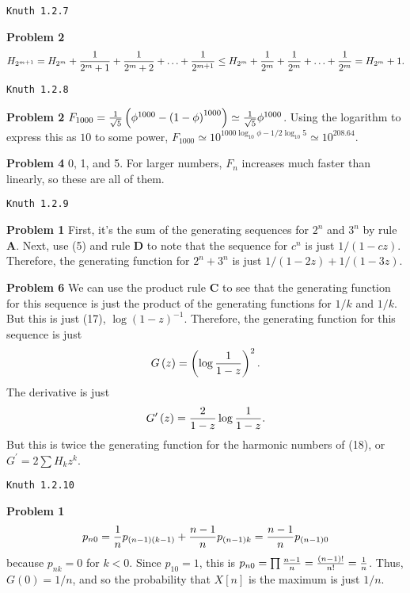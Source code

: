 \vskip 0.5in
\centerline{\tt Knuth 1.2.7}
\vskip 0.5in

\noindent
{\bf Problem 2} $$ H_{2^{m+1}} = H_{2^m} + {1 \over 2^m+1 } + {1 \over 2^m + 2 } + \ldots + {1 \over 2^{m+1}}
 \le H_{2^m} + {1 \over 2^m} + {1 \over 2^m} + \ldots + {1\over 2^m} = H_{2^m} + 1. $$

\vskip 0.5in
\centerline{\tt Knuth 1.2.8}
\vskip 0.5in

\noindent
{\bf Problem 2} $F_{1000} = {1 \over \sqrt{5}} \left( \phi^{1000} - \left(1-\phi \right)^{1000} \right) 
 \simeq {1 \over \sqrt{5}} \phi^{1000}$.  Using the logarithm to express this as $10$ to some power, 
  $F_{1000} \simeq 10^{1000 \log_{10} \phi - 1/2 \log_{10} 5} \simeq 10^{208.64}$.

\vskip 0.1in
\noindent
{\bf Problem 4} 0, 1, and 5.  For larger numbers, $F_n$ increases much faster than linearly, so these are
 all of them.
 
\vskip 0.5in
\centerline{\tt Knuth 1.2.9}
\vskip 0.5in

\noindent
{\bf Problem 1} First, it's the sum of the generating sequences for $2^n$ and $3^n$ by rule {\bf A}.  Next,
  use (5) and rule {\bf D} to note that the sequence for $c^n$ is just $1 / \left( 1-c z \right)$.  Therefore, the generating
  function for $2^n + 3^n$ is just $1 / \left( 1 - 2 z \right) + 1 / \left(1 - 3 z\right)$.

\vskip 0.1in
\noindent
{\bf Problem 6} We can use the product rule {\bf C} to see that the generating function for this sequence
 is just the product of the generating functions for $1/k$ and $1/k$.  But this is just (17), $ \log \left(1-z\right)^{-1}$.
 Therefore, the generating function for this sequence is just 
 $$
    G\left(z\right) = \left( \log {1 \over 1 - z} \right)^2.
 $$
 The derivative is just 
 $$
   G^{\prime} \left(z\right) = {2 \over 1-z} \log {1 \over 1-z}.
 $$
 But this is twice the generating function for the harmonic numbers of (18), or
 $G^{\prime} = 2 \sum H_k z^k$.

\vskip 0.5in
\centerline{\tt Knuth 1.2.10}
\vskip 0.5in

\noindent
{\bf Problem 1} 
  $$ 
     p_{n0} = {1 \over n} p_{\left(n-1\right)\left(k-1\right)} + {n-1 \over n} p_{\left(n-1\right) k}
            = {n - 1 \over n} p_{\left(n-1\right) 0}
  $$
  because $p_{nk} = 0$ for $k < 0$.  Since $p_{10} = 1$, this is $p_{n0} = \prod {n - 1 \over n} = 
    {\left(n-1\right)! \over n!} = {1 \over n}$.  Thus, $G\left(0\right) = 1/n$, and so the probability
  that $X\left[n\right]$ is the maximum is just $1/n$.

